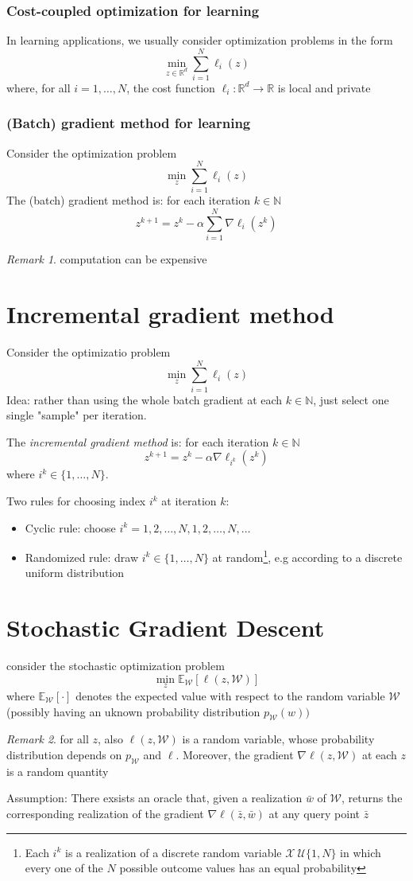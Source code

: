 \documentclass{book}
\newcommand{\R}{\mathbb{R}}
\newcommand{\N}{\mathbb{N}}
\theoremstyle{theoremv2}
\theoremstyle{defv2}
\theoremstyle{remark}
\newtheorem*{remark}{Remark}
\theoremstyle{remark}
\theoremstyle{definition}
\theoremstyle{definition}
\begin{document}
\subsubsection{Cost-coupled optimization for learning}
In learning applications, we usually consider optimization problems in the form 
\[
    \min_{z\in\R^d}\displaystyle\sum_{i=1}^{N}\ell_i(z)
\]
where, for all $i=1,\dots,N$, the cost function $\ell_i:\R^d\to \R$ is local and private 
\subsubsection{(Batch) gradient method for learning}
Consider the optimization problem 
\[
    \min_z \displaystyle\sum_{i=1}^{N}\ell_i(z)
\]
The (batch) gradient method is: for each iteration $k\in\N$ 
\[
    z^{k+1} = z^k -\alpha \displaystyle\sum_{i=1}^{N}\nabla\ell_i(z^k)
\]
\begin{remark}
    computation can be expensive
\end{remark}
\section{Incremental gradient method}
Consider the optimizatio problem
\[
    \min_z \displaystyle\sum_{i=1}^{N}\ell_i(z)
\]
Idea: rather than using the whole batch gradient at each $k\in\N$, just select one single "sample" per iteration. 

The \emph{incremental gradient method} is: for each iteration $k\in\N$
\[
    z^{k+1} = z^k - \alpha\nabla\ell_{i^k}(z^k)
\]
where $i^k\in\{1,\dots,N\}$. 

Two rules for choosing index $i^k$ at iteration $k$: 
\begin{itemize}
    \item Cyclic rule: choose $i^k = 1,2,\dots,N,1,2,\dots,N,\dots$
    \item Randomized rule: draw $i^k\in\{ 1,\dots,N \}$ at random\footnote{Each $i^k$ is a realization of a discrete random variable $\mathcal{X}~\mathcal{U}\{1,N\}$ in which every one of the $N$ possible outcome values has an equal probability}, e.g according to a discrete uniform distribution
\end{itemize}
\section{Stochastic Gradient Descent}
consider the stochastic optimization problem 
\[
    \min_z \mathbb{E}_{\mathcal{W}}[\ell(z,\mathcal{W})]
\]
where $\mathbb{E}_{\mathcal{W}}[\cdot]$ denotes the expected value with respect to the random variable $\mathcal{W}$ (possibly having an uknown probability distribution $p_{\mathcal{W}}(w))$
\begin{remark}
    for all $z$, also $\ell(z,\mathcal{W})$ is a random variable, whose probability distribution depends on $p_{\mathcal{W}}$ and $\ell$. Moreover, the gradient $\nabla\ell(z,\mathcal{W})$ at each $z$ is a random quantity
\end{remark}
Assumption: There exsists an oracle that, given a realization $\bar{w}$ of $\mathcal{W}$, returns the corresponding realization of the gradient $\nabla\ell(\bar{z},\bar{w})$ at any query point $\bar{z}$
\end{document}
